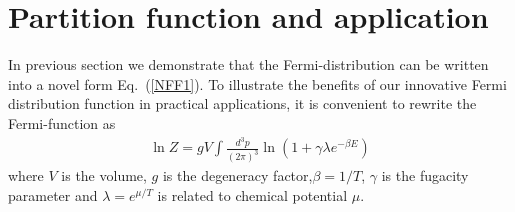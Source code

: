 \documentclass[sn-mathphys,Numbered]{sn-jnl}
\theoremstyle{thmstyleone}%
\theoremstyle{thmstyletwo}%
\theoremstyle{thmstylethree}%
\begin{document}

\section{Partition function and application}\label{NumericalResult}
In previous section we demonstrate that the Fermi-distribution can be written into a novel form Eq.~(\ref{NFF1}). To illustrate the benefits of our innovative Fermi distribution function in practical applications, it is convenient to rewrite the Fermi-function as \cite{Letessier:2002ony}
\begin{align}
\ln{Z}={gV}\int \frac{d^3p}{(2\pi)^3}\ln(1+\gamma\lambda e^{-\beta E})
\end{align}
where $V$ is the volume, $g$ is the degeneracy factor,$\beta=1/T$,  $\gamma$ is the fugacity parameter and $\lambda=e^{\mu/T}$ is related to chemical potential $\mu$. 
\end{document}

